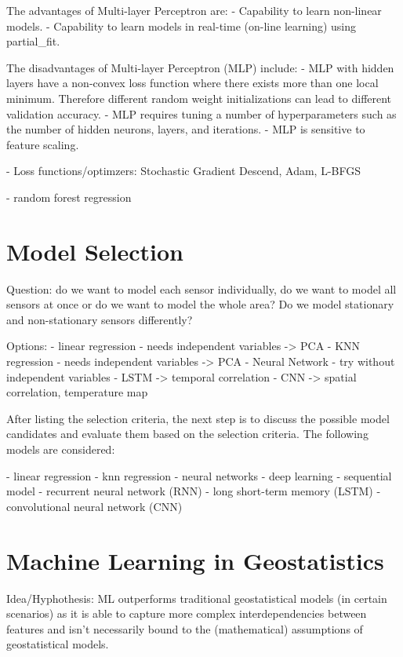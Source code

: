 The advantages of Multi-layer Perceptron are:
- Capability to learn non-linear models.
- Capability to learn models in real-time (on-line learning) using partial\_fit.

The disadvantages of Multi-layer Perceptron (MLP) include:
- MLP with hidden layers have a non-convex loss function where there exists more than one local minimum. Therefore different random weight initializations can lead to different validation accuracy.
- MLP requires tuning a number of hyperparameters such as the number of hidden neurons, layers, and iterations.
- MLP is sensitive to feature scaling.

- Loss functions/optimzers: Stochastic Gradient Descend, Adam, L-BFGS


- random forest regression

\section{Model Selection}

Question: do we want to model each sensor individually, do we want to model all sensors at once or do we want to model the whole area?
Do we model stationary and non-stationary sensors differently?

Options:
- linear regression
    - needs independent variables -> PCA
- KNN regression
    - needs independent variables -> PCA
- Neural Network
    - try without independent variables
    - LSTM -> temporal correlation
    - CNN -> spatial correlation, temperature map

After listing the selection criteria, the next step is to discuss the possible model candidates and evaluate them based on the selection criteria. The following models are considered:

- linear regression
- knn regression
- neural networks
    - deep learning
        - sequential model
        - recurrent neural network (RNN)
        - long short-term memory (LSTM)
        - convolutional neural network (CNN)


\section{Machine Learning in Geostatistics}

Idea/Hyphothesis: ML outperforms traditional geostatistical models (in certain scenarios) as it is able to capture more complex interdependencies between features and isn't necessarily bound to the (mathematical) assumptions of geostatistical models.

